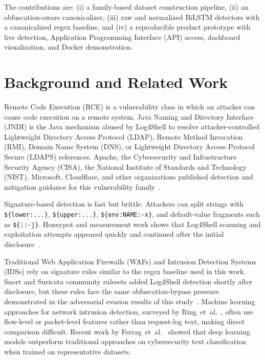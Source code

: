 \documentclass[conference]{IEEEtran}
\begin{document}
The contributions are: (i) a family-based dataset construction pipeline, (ii)
an obfuscation-aware canonicalizer, (iii) raw and normalized BiLSTM detectors
with a canonicalized regex baseline, and (iv) a reproducible
product prototype with live detection, Application Programming Interface (API)
access, dashboard visualization, and Docker demonstration.

\section{Background and Related Work}

Remote Code Execution (RCE) is a vulnerability class in which an attacker can
cause code execution on a remote system. Java Naming and Directory Interface
(JNDI) is the Java mechanism abused by Log4Shell to resolve attacker-controlled
Lightweight Directory Access Protocol (LDAP), Remote Method Invocation (RMI),
Domain Name System (DNS), or Lightweight Directory Access Protocol Secure
(LDAPS) references. Apache, the Cybersecurity and Infrastructure Security
Agency (CISA), the National Institute of Standards and Technology (NIST),
Microsoft, Cloudflare, and other organizations published detection and
mitigation guidance for this vulnerability family~\cite{apache_security,cisa_advisory,nvd,microsoft_guidance,cloudflare_payloads}.

Signature-based detection is fast but brittle. Attackers can split strings
with \texttt{\$\{lower:...\}}, \texttt{\$\{upper:...\}},
\texttt{\$\{env:NAME:-x\}}, and default-value fragments such as
\texttt{\$\{::-j\}}. Honeypot and measurement work shows that Log4Shell
scanning and exploitation attempts appeared quickly and continued after the
initial disclosure~\cite{honeynet_data,race_vulnerable,greedybear_docs}.

Traditional Web Application Firewalls (WAFs) and Intrusion Detection Systems
(IDSs) rely on signature rules similar to the regex baseline used in this
work. Snort and Suricata community rulesets added Log4Shell detection
shortly after disclosure, but these rules face the same obfuscation-bypass
pressure demonstrated in the adversarial evasion results of this
study~\cite{mirsky2023}. Machine learning approaches for network intrusion
detection, surveyed by Ring~et~al.~\cite{ring2019}, often use flow-level or
packet-level features rather than request-log text, making direct comparison
difficult. Recent work by Ferrag~et~al.~\cite{ferrag2020} showed that deep
learning models outperform traditional approaches on cybersecurity text
classification when trained on representative datasets.
\end{document}
